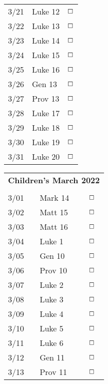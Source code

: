 \documentclass[10pt,landscape,letterpaper]{article}
\begin{document}
\begin{multicols}{5}
\begin{tabular}{p{0.5in}p{0.65in}p{0.3in}}
3/21 & Luke 12 & $\boxempty$ \\
3/22 & Luke 13 & $\boxempty$ \\
3/23 & Luke 14 & $\boxempty$ \\
3/24 & Luke 15 & $\boxempty$ \\
3/25 & Luke 16 & $\boxempty$ \\
\textcolor[rgb]{1.00,0.00,0.00}{3/26} & \textcolor[rgb]{1.00,0.00,0.00}{Gen 13} & $\boxempty$ \\
\textcolor[rgb]{1.00,0.00,0.00}{3/27} & \textcolor[rgb]{1.00,0.00,0.00}{Prov 13} & $\boxempty$ \\

3/28 & Luke 17 & $\boxempty$ \\
3/29 & Luke 18 & $\boxempty$ \\
3/30 & Luke 19 & $\boxempty$ \\
3/31 & Luke 20 & $\boxempty$ \\

\end{tabular}


\begin{tabular}{p{0.5in}p{0.65in}p{0.3in}}
\multicolumn{3}{c}{\textbf{Children's March 2022}} \\
     &       &             \\
3/01 & Mark 14 & $\boxempty$ \\
3/02 & Matt 15 & $\boxempty$ \\
3/03 & Matt 16 & $\boxempty$ \\
3/04 & Luke 1 & $\boxempty$ \\
\textcolor[rgb]{1.00,0.00,0.00}{3/05} & \textcolor[rgb]{1.00,0.00,0.00}{Gen 10} & $\boxempty$ \\
\textcolor[rgb]{1.00,0.00,0.00}{3/06} & \textcolor[rgb]{1.00,0.00,0.00}{Prov 10} & $\boxempty$ \\

3/07 & Luke 2 & $\boxempty$ \\
3/08 & Luke 3 & $\boxempty$ \\
3/09 & Luke 4 & $\boxempty$ \\
3/10 & Luke 5 & $\boxempty$ \\
3/11 & Luke 6 & $\boxempty$ \\
\textcolor[rgb]{1.00,0.00,0.00}{3/12} & \textcolor[rgb]{1.00,0.00,0.00}{Gen 11} & $\boxempty$ \\
\textcolor[rgb]{1.00,0.00,0.00}{3/13} & \textcolor[rgb]{1.00,0.00,0.00}{Prov 11} & $\boxempty$ \\


\end{tabular}
\end{multicols}
\end{document}
